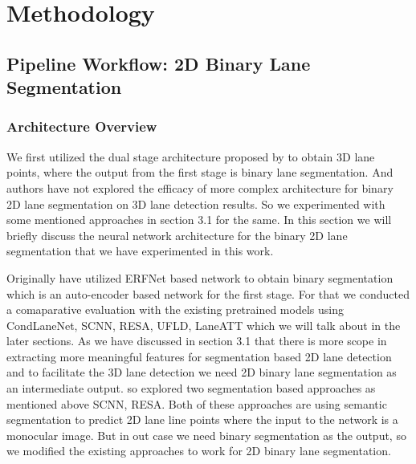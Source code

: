 

    \chapter{Methodology}

    \section{Pipeline Workflow: 2D Binary Lane Segmentation}
        \subsection{Architecture Overview}
        We first utilized the dual stage architecture proposed by \cite{guo2020gen} to obtain 3D lane points, where the output from the first stage is binary lane segmentation. And authors have not explored the efficacy of more complex architecture for binary 2D lane segmentation on 3D lane detection results. So we experimented with some mentioned approaches in section 3.1 for the same. In this section we will briefly discuss the neural network architecture for the binary 2D lane segmentation that we have experimented in this work. 
        
        Originally \cite{guo2020gen} have utilized ERFNet\cite{Romera2018ERFNetER} based network to obtain binary segmentation which is an auto-encoder based network for the first stage. For that we conducted a comaparative evaluation with the existing pretrained models using CondLaneNet\cite{DBLP:journals/corr/abs-2105-05003}, SCNN\cite{pan2018SCNN}, RESA\cite{DBLP:journals/corr/abs-2008-13719}, UFLD\cite{DBLP:journals/corr/abs-2004-11757}, LaneATT\cite{https://doi.org/10.48550/arxiv.2010.12035} which we will talk about in the later sections. As we have discussed in section 3.1 that there is more scope in extracting more meaningful features for segmentation based 2D lane detection and to facilitate the 3D lane detection we need 2D binary lane segmentation as an intermediate output. so explored two segmentation based approaches as mentioned above SCNN\cite{pan2018SCNN}, RESA\cite{DBLP:journals/corr/abs-2008-13719}. Both of these approaches are using semantic segmentation to predict 2D lane line points where the input to the network is a monocular image. But in out case we need binary segmentation as the output, so we modified the existing approaches to work for 2D binary lane segmentation.    
        
